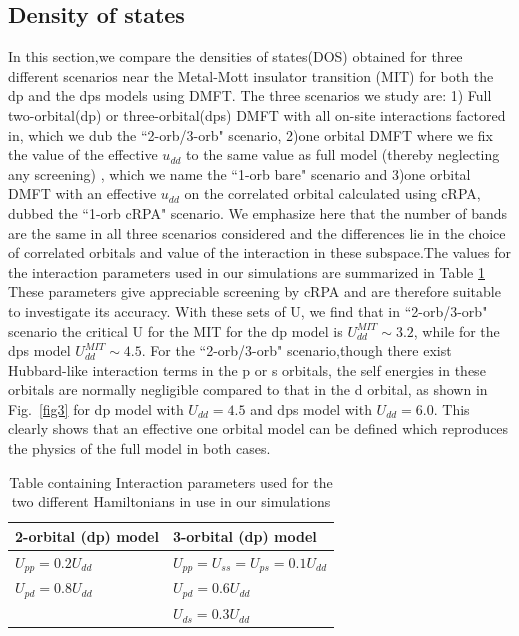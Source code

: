\documentclass[10pt]{ruthesis}
\begin{document}
{\subsection{\label{DOS}Density of states}
In this section,we compare the densities of states(DOS) obtained for three different scenarios near the Metal-Mott insulator transition (MIT) for both the dp and the dps models using DMFT. The three scenarios we study are: 1) Full two-orbital(dp) or three-orbital(dps) DMFT with all on-site interactions factored in, which we  dub the ``2-orb/3-orb" scenario, 2)one orbital DMFT  where we fix the value of the effective $u_{dd}$ to the same value as full model (thereby neglecting any screening) , which we name the ``1-orb bare" scenario and 3)one orbital DMFT with an effective $u_{dd}$ on the correlated orbital calculated using cRPA,  dubbed the ``1-orb cRPA" scenario. We emphasize here that the number of bands are the same in all three scenarios considered and the differences lie in the choice of correlated orbitals and value of the interaction in these subspace.The values for the interaction parameters used in our simulations are summarized in Table \ref{U_table} These parameters give appreciable screening by cRPA and are therefore suitable to investigate its accuracy. With these sets of U, we find that in ``2-orb/3-orb" scenario the critical U for the MIT for the dp model is $U^{MIT}_{dd}\sim 3.2$, while for the dps model  $U^{MIT}_{dd}\sim 4.5$. For the ``2-orb/3-orb" scenario,though there exist Hubbard-like interaction terms in the p or s orbitals, the self energies in these orbitals are normally negligible compared to that in the d orbital, as shown in Fig.~\ref{fig3}  for dp model with $U_{dd}=4.5$ and dps model with $U_{dd}=6.0$. This clearly shows that an effective one orbital model can be defined which reproduces the physics of the full model in both cases.

\begin{table} [H]
\begin{center}
\begin{tabular}{|l|l|}
\hline  
  2-orbital (dp) model & 3-orbital (dp) model\\
  \hline
   
   $U_{pp}=0.2U_{dd}$  & $U_{pp}=U_{ss}=U_{ps}=0.1U_{dd}$ \\
   
  
  $U_{pd}=0.8U_{dd}$ & $U_{pd}=0.6U_{dd}$\\
   & $U_{ds}=0.3U_{dd}$ \\
  \hline
\end{tabular}
\end{center}
\caption{\label{U_table}Table containing Interaction parameters used for the two different Hamiltonians in use in our simulations }
\end{table}


}
\end{document}

